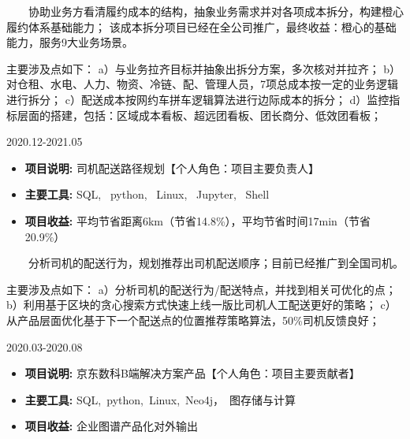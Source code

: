 \documentclass{resume}
\begin{document}
{    \ \ \ \ 
协助业务方看清履约成本的结构，抽象业务需求并对各项成本拆分，构建橙心履约体系基础能力；
该成本拆分项目已经在全公司推广，最终收益：橙心的基础能力，服务9大业务场景。

主要涉及点如下：
a）与业务拉齐目标并抽象出拆分方案，多次核对并拉齐；
b）对仓租、水电、人力、物资、冷链、配、管理人员，7项总成本按一定的业务逻辑进行拆分；
c）配送成本按网约车拼车逻辑算法进行边际成本的拆分；
d）监控指标层面的搭建，包括：区域成本看板、超远团看板、团长商分、低效团看板；

\medskip











                      {2020.12-2021.05}

\begin{itemize}  [parsep=0.5ex]

  \item   \textbf{  项目说明:  }   { 司机配送路径规划【个人角色：项目主要负责人】 } 
  \item   \textbf{  主要工具:  }   {  SQL, \ python, \ Linux, \ Jupyter, \ Shell }
  \item   \textbf{  项目收益:  }   {  平均节省距离6km（节省14.8\%），平均节省时间17min（节省20.9\%） }

\end{itemize}


{    \ \ \ \ 
分析司机的配送行为，规划推荐出司机配送顺序；目前已经推广到全国司机。

主要涉及点如下：
a）分析司机的配送行为/配送特点，并找到相关可优化的点；
b）利用基于区块的贪心搜索方式快速上线一版比司机人工配送更好的策略；
c）从产品层面优化基于下一个配送点的位置推荐策略算法，50\%司机反馈良好；
}

\medskip















                      {2020.03-2020.08}

\begin{itemize}  [parsep=0.5ex]

  \item   \textbf{  项目说明:  }   {  京东数科B端解决方案产品【个人角色：项目主要贡献者】  } 
  \item   \textbf{  主要工具:  }   {  SQL,\ python,\ Linux,\ Neo4j，\ 图存储与计算 }
  \item   \textbf{  项目收益:  }   {  企业图谱产品化对外输出 }


\end{itemize}}
\end{document}
